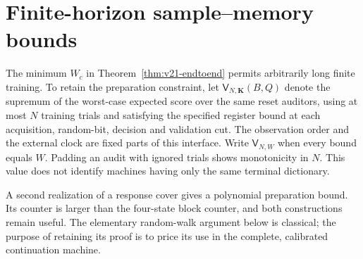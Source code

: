 \section{Finite-horizon sample--memory bounds}
\label{sec:v22-frontier}
The minimum $W_c$ in Theorem~\ref{thm:v21-endtoend} permits arbitrarily
long finite training. To retain the preparation constraint, let
$\mathsf V_{N,\boldsymbol K}(B,Q)$ denote the supremum of the worst-case
expected score over the same reset auditors, using at most $N$ training
trials and satisfying the specified register bound at each acquisition,
random-bit, decision and validation cut. The observation order and the
external clock are fixed parts of this interface. Write
$\mathsf V_{N,W}$ when every bound equals $W$. Padding an audit with
ignored trials shows monotonicity in $N$. This value does not identify
machines having only the same terminal dictionary.

A second realization of a response cover gives a polynomial preparation
bound. Its counter is larger than the four-state block counter, and
both constructions remain useful. The elementary random-walk argument
below is classical; the purpose of retaining its proof is to price its
use in the complete, calibrated continuation machine.

